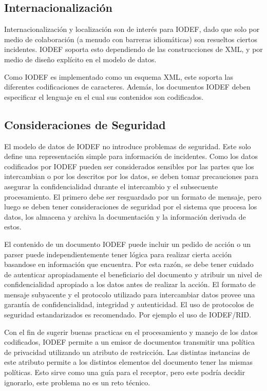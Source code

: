 \subsection{Internacionalización}
Internacionalización y localización son de interés para IODEF, dado que solo por 
medio de colaboración (a menudo con barreras idiomáticas) son resueltos ciertos 
incidentes. IODEF soporta esto dependiendo de las construcciones de XML, y por 
medio de diseño explícito en el modelo de datos.

Como IODEF es implementado como un esquema XML, este soporta las diferentes 
codificaciones de caracteres. Además, los documentos IODEF deben especificar el 
lenguaje en el cual sus contenidos son codificados. 

\subsection{Consideraciones de Seguridad}
El modelo de datos de IODEF no introduce problemas de seguridad. Este solo 
define una representación simple para información de incidentes. Como los datos 
codificados por IODEF pueden ser considerados sensibles por las partes que los 
intercambian o por los descritos por los datos, se deben tomar precauciones para 
asegurar la confidencialidad durante el intercambio y el subsecuente 
procesamiento. El primero debe ser resguardado por un formato de mensaje, pero 
luego se deben tener consideraciones de seguridad por el sistema que procesa los 
datos, los almacena y archiva la documentación y la información derivada de 
estos.

El contenido de un documento IODEF puede incluir un pedido de acción o un parser 
puede independientemente tener lógica para realizar cierta acción basandose en 
información que encuentra. Por esta razón, se debe tener cuidado de autenticar 
apropiadamente el beneficiario del documento y atribuir un nivel de 
confidencialidad apropiado a los datos antes de realizar la acción.
El formato de mensaje subyacente  y el protocolo utilizado para intercambiar 
datos provee una garantía de confidencialidad, integridad  y autenticidad. El 
uso de protocolos de seguridad estandarizados es recomendado. Por ejemplo el uso 
de IODEF/RID.

Con el fin de sugerir buenas practicas en el  procesamiento y manejo de los 
datos codificados, IODEF  permite a un emisor de documentos transmitir una 
política de privacidad utilizando un atributo de restricción. Las distintas 
instancias de este atributo permite a los distintos elementos del documento 
tener las mismas políticas. Esto sirve como una guía para el receptor, pero este 
podría decidir ignorarlo, este problema no es un reto técnico.

